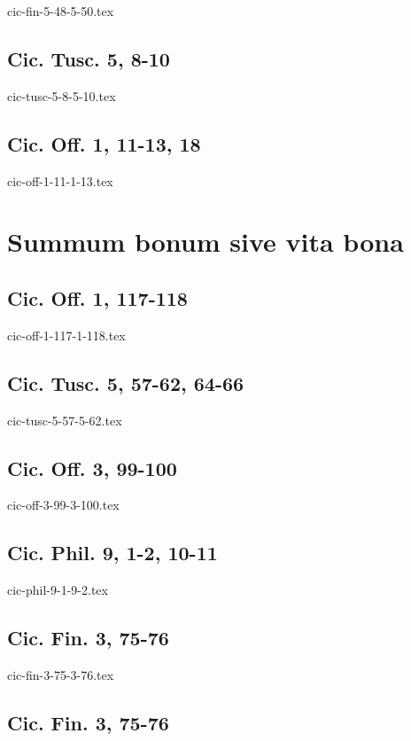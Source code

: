 \documentclass[a4paper,12pt,twoside]{book}
\begin{document}
{cic-fin-5-48-5-50.tex}

\section{Cic. Tusc. 5, 8-10}

{cic-tusc-5-8-5-10.tex}

\section{Cic. Off. 1, 11-13, 18}

{cic-off-1-11-1-13.tex}

\chapter{Summum bonum sive vita bona}

\section{Cic. Off. 1, 117-118}

{cic-off-1-117-1-118.tex}

\section{Cic. Tusc. 5, 57-62, 64-66}

{cic-tusc-5-57-5-62.tex}

\section{Cic. Off. 3, 99-100}

{cic-off-3-99-3-100.tex}

\section{Cic. Phil. 9, 1-2, 10-11}

{cic-phil-9-1-9-2.tex}

\section{Cic. Fin. 3, 75-76}

{cic-fin-3-75-3-76.tex}

\section{Cic. Fin. 3, 75-76}
\end{document}
